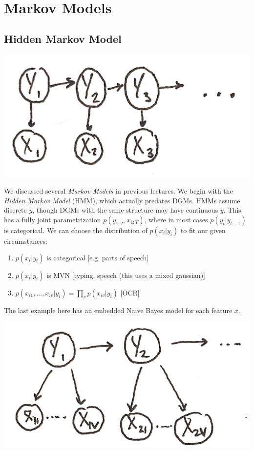 \documentclass{article}
\begin{document}
\section{Markov Models}
\subsection{Hidden Markov Model}
\begin{center}
\includegraphics[scale=.1]{HMM} 
\end{center}
We discussed several \textit{Markov Models} in previous lectures. We begin with the \textit{Hidden Markov Model} (HMM), which actually predates DGMs. HMMs assume discrete $y$, though DGMs with the same structure may have continuous $y$. This has a fully joint parametrization $p(y_{1:T},x_{1:T})$, where in most cases $p(y_t | y_{t-1})$ is categorical. We can choose the distribution of $p(x_i|y_i)$ to fit our given circumstances:
\begin{enumerate}
\item $p(x_i|y_i)$ is categorical [e.g. parts of speech]
\item $p(x_i|y_i)$ is MVN [typing, speech (this uses a mixed gaussian)]
\item $p(x_{i1},\ldots,x_{iv}|y_i) = \prod\limits_v p(x_{iv} | y_i)$ [OCR]
\end{enumerate}
The last example here has an embedded Naive Bayes model for each feature $x$. 
\begin{center}
\includegraphics[scale=.1]{HMM_NB} 
\end{center}
\end{document}

